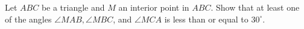 Let $ABC$ be a triangle and $M$ an interior point in $ABC$. Show that at least one of the angles $\angle MAB, \angle MBC$, and $\angle MCA$ is less than or equal to $30^\circ$.
